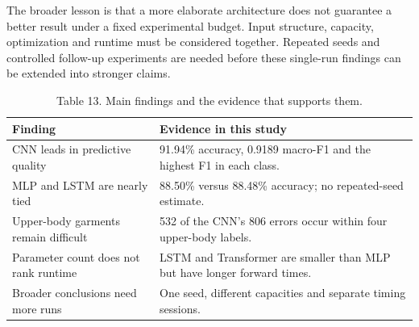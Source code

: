 The broader lesson is that a more elaborate architecture does not guarantee
a better result under a fixed experimental budget. Input structure, capacity,
optimization and runtime must be considered together. Repeated seeds and
controlled follow-up experiments are needed before these single-run findings
can be extended into stronger claims.

\vspace{8pt}
\begin{table}[H]\centering
\caption{Table 13. Main findings and the evidence that supports them.}
\begin{tabularx}{\linewidth}{lX}\toprule
Finding & Evidence in this study\\\midrule
CNN leads in predictive quality &
91.94\% accuracy, 0.9189 macro-F1 and the highest F1 in each class.\\
MLP and LSTM are nearly tied &
88.50\% versus 88.48\% accuracy; no repeated-seed estimate.\\
Upper-body garments remain difficult &
532 of the CNN's 806 errors occur within four upper-body labels.\\
Parameter count does not rank runtime &
LSTM and Transformer are smaller than MLP but have longer forward times.\\
Broader conclusions need more runs &
One seed, different capacities and separate timing sessions.\\\bottomrule
\end{tabularx}
\end{table}




